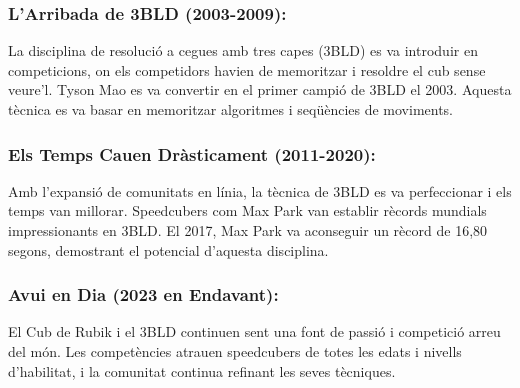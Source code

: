 \subsubsection{L'Arribada de 3BLD (2003-2009):}

La disciplina de resolució a cegues amb tres capes (3BLD) es va introduir en competicions, on els competidors havien de memoritzar i resoldre el cub sense veure'l. Tyson Mao es va convertir en el primer campió de 3BLD el 2003. Aquesta tècnica es va basar en memoritzar algoritmes i seqüències de moviments.

\subsubsection{Els Temps Cauen Dràsticament (2011-2020):}

Amb l'expansió de comunitats en línia, la tècnica de 3BLD es va perfeccionar i els temps van millorar. Speedcubers com Max Park van establir rècords mundials impressionants en 3BLD. El 2017, Max Park va aconseguir un rècord de 16,80 segons, demostrant el potencial d'aquesta disciplina.

\subsubsection{Avui en Dia (2023 en Endavant):}

El Cub de Rubik i el 3BLD continuen sent una font de passió i competició arreu del món. Les competències atrauen speedcubers de totes les edats i nivells d'habilitat, i la comunitat continua refinant les seves tècniques.




